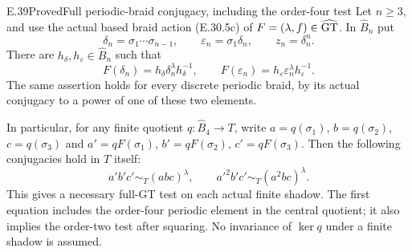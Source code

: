 \begin{statement}{E.39}{Proved}{Full periodic-braid conjugacy, including the order-four test}
Let $n\ge3$, and use the actual based braid action
\textup{(E.30.5c)} of $F=(\lambda,f)\in\widehat{\rm GT}$.
In $\widehat B_n$ put
\[
 \delta_n=\sigma_1\cdots\sigma_{n-1},\qquad
 \varepsilon_n=\sigma_1\delta_n,\qquad z_n=\delta_n^n.
 \tag{E.39.1}
\]
There are $h_\delta,h_\varepsilon\in\widehat B_n$ such that
\[
 F(\delta_n)=h_\delta\delta_n^\lambda h_\delta^{-1},
 \qquad
 F(\varepsilon_n)=h_\varepsilon\varepsilon_n^\lambda
                                  h_\varepsilon^{-1}.
 \tag{E.39.2}
\]
The same assertion holds for every discrete periodic braid,
by its actual conjugacy to a power of one of these two elements.

In particular, for any finite quotient $q:\widehat B_4\to T$,
write $a=q(\sigma_1)$, $b=q(\sigma_2)$, $c=q(\sigma_3)$
and $a'=qF(\sigma_1)$, $b'=qF(\sigma_2)$, $c'=qF(\sigma_3)$.
Then the following conjugacies hold in $T$ itself:
\[
 a'b'c'\sim_T(abc)^\lambda,
 \qquad a'^2b'c'\sim_T(a^2bc)^\lambda.
 \tag{E.39.3}
\]
This gives a necessary full-GT test on each actual finite
shadow.  The first equation includes the order-four
periodic element in the central quotient; it also implies
the order-two test after squaring.  No invariance of
$\ker q$ under a finite shadow is assumed.
\end{statement}
